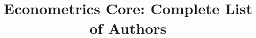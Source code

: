 \documentclass{tex/tufte-handout}
\title{Econometrics Core: Complete List of Authors}
\begin{document}
\maketitle
\bigskip

\end{document}
